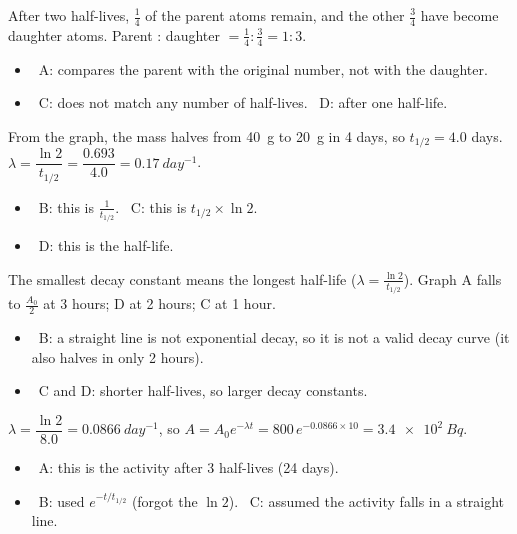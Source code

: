 \documentclass[12pt]{article}
\begin{document}
\begin{practiceanswers}
\begin{practiceans}
  After two half-lives, $\frac{1}{4}$ of the parent atoms remain, and the other $\frac{3}{4}$ have become
  daughter atoms. Parent : daughter $= \frac{1}{4} : \frac{3}{4} = 1 : 3$.
  \begin{itemize}
    \item \xmark\ A: compares the parent with the original number, not with the daughter.
    \item \xmark\ C: does not match any number of half-lives. \quad \xmark\ D: after one half-life.
  \end{itemize}
\end{practiceans}

\begin{practiceans}
  From the graph, the mass halves from \qty{40}{g} to \qty{20}{g} in 4 days, so $t_{1/2} = 4.0$ days.
  $\lambda = \dfrac{\ln 2}{t_{1/2}} = \dfrac{0.693}{4.0} = \qty{0.17}{day^{-1}}$.
  \begin{itemize}
    \item \xmark\ B: this is $\frac{1}{t_{1/2}}$. \quad \xmark\ C: this is $t_{1/2} \times \ln 2$.
    \item \xmark\ D: this is the half-life.
  \end{itemize}
\end{practiceans}

\begin{practiceans}
  The smallest decay constant means the longest half-life ($\lambda = \frac{\ln 2}{t_{1/2}}$). Graph A
  falls to $\frac{A_0}{2}$ at 3 hours; D at 2 hours; C at 1 hour.
  \begin{itemize}
    \item \xmark\ B: a straight line is not exponential decay, so it is not a valid decay curve (it also
          halves in only 2 hours).
    \item \xmark\ C and D: shorter half-lives, so larger decay constants.
  \end{itemize}
\end{practiceans}

\begin{practiceans}
  $\lambda = \dfrac{\ln 2}{8.0} = \qty{0.0866}{day^{-1}}$, so
  $A = A_0 e^{-\lambda t} = 800\,e^{-0.0866 \times 10} = \qty{3.4e2}{Bq}$.
  \begin{itemize}
    \item \xmark\ A: this is the activity after 3 half-lives (24 days).
    \item \xmark\ B: used $e^{-t/t_{1/2}}$ (forgot the $\ln 2$). \quad \xmark\ C: assumed the activity
          falls in a straight line.
  \end{itemize}
\end{practiceans}


\end{practiceanswers}
\end{document}
